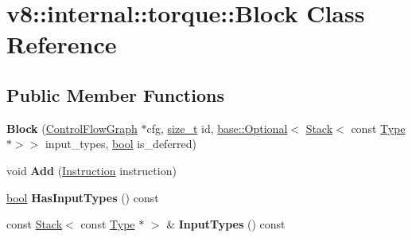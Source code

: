 \hypertarget{classv8_1_1internal_1_1torque_1_1Block}{}\section{v8\+:\+:internal\+:\+:torque\+:\+:Block Class Reference}
\label{classv8_1_1internal_1_1torque_1_1Block}
\subsection*{Public Member Functions}
\begin{DoxyCompactItemize}
\item 
\mbox{\label{classv8_1_1internal_1_1torque_1_1Block_ad1a59696dc8eaf8774938f2159c7d1aa}} 
{\bfseries Block} (\mbox{\hyperlink{classv8_1_1internal_1_1torque_1_1ControlFlowGraph}{Control\+Flow\+Graph}} $\ast$cfg, \mbox{\hyperlink{classsize__t}{size\+\_\+t}} id, \mbox{\hyperlink{classv8_1_1base_1_1Optional}{base\+::\+Optional}}$<$ \mbox{\hyperlink{classv8_1_1internal_1_1torque_1_1Stack}{Stack}}$<$ const \mbox{\hyperlink{classv8_1_1internal_1_1torque_1_1Type}{Type}} $\ast$$>$$>$ input\+\_\+types, \mbox{\hyperlink{classbool}{bool}} is\+\_\+deferred)
\item 
\mbox{\label{classv8_1_1internal_1_1torque_1_1Block_aac2824dc390b57440c0d0f68ba26828a}} 
void {\bfseries Add} (\mbox{\hyperlink{classv8_1_1internal_1_1torque_1_1Instruction}{Instruction}} instruction)
\item 
\mbox{\label{classv8_1_1internal_1_1torque_1_1Block_a9ea154be544c6090f266d574480b4aae}} 
\mbox{\hyperlink{classbool}{bool}} {\bfseries Has\+Input\+Types} () const
\item 
\mbox{\label{classv8_1_1internal_1_1torque_1_1Block_a7ff0fb4b818748b36fa28d863c526707}} 
const \mbox{\hyperlink{classv8_1_1internal_1_1torque_1_1Stack}{Stack}}$<$ const \mbox{\hyperlink{classv8_1_1internal_1_1torque_1_1Type}{Type}} $\ast$ $>$ \& {\bfseries Input\+Types} () const
\item 
\mbox{\label{classv8_1_1internal_1_1torque_1_1Block_ac3b0befbcecd0ef337c1ca115013ab3c}} 

\end{DoxyCompactItemize}
